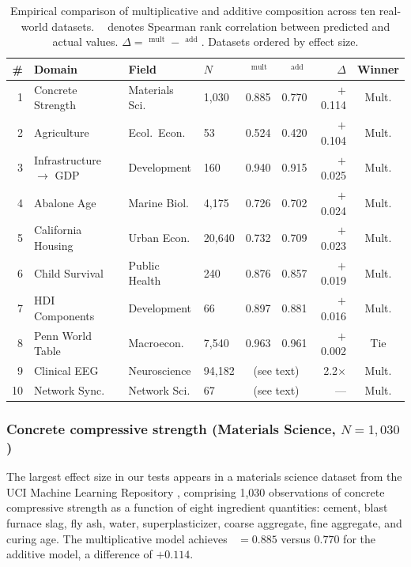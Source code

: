\documentclass[12pt, a4paper]{article}
\theoremstyle{definition}
\theoremstyle{remark}
\DeclareMathOperator{\Spearman}{\rho_s}
\begin{document}
\begin{table}[H]
\centering
\caption{Empirical comparison of multiplicative and additive composition across ten real-world datasets. $\Spearman$ denotes Spearman rank correlation between predicted and actual values. $\Delta = \Spearman^{\text{mult}} - \Spearman^{\text{add}}$. Datasets ordered by effect size.}\label{tab:results}
\smallskip
\begin{tabular}{@{}rlllrrrc@{}}
\toprule
\# & Domain & Field & $N$ & $\Spearman^{\text{mult}}$ & $\Spearman^{\text{add}}$ & $\Delta$ & Winner \\
\midrule
1 & Concrete Strength & Materials Sci. & 1{,}030 & 0.885 & 0.770 & $+$0.114 & Mult. \\
2 & Agriculture & Ecol.\ Econ. & 53 & 0.524 & 0.420 & $+$0.104 & Mult. \\
3 & Infrastructure $\to$ GDP & Development & 160 & 0.940 & 0.915 & $+$0.025 & Mult. \\
4 & Abalone Age & Marine Biol. & 4{,}175 & 0.726 & 0.702 & $+$0.024 & Mult. \\
5 & California Housing & Urban Econ. & 20{,}640 & 0.732 & 0.709 & $+$0.023 & Mult. \\
6 & Child Survival & Public Health & 240 & 0.876 & 0.857 & $+$0.019 & Mult. \\
7 & HDI Components & Development & 66 & 0.897 & 0.881 & $+$0.016 & Mult. \\
8 & Penn World Table & Macroecon. & 7{,}540 & 0.963 & 0.961 & $+$0.002 & Tie \\
\midrule
9 & Clinical EEG & Neuroscience & 94{,}182 & \multicolumn{2}{c}{(see text)} & 2.2$\times$ & Mult. \\
10 & Network Sync. & Network Sci. & 67 & \multicolumn{2}{c}{(see text)} & --- & Mult. \\
\bottomrule
\end{tabular}
\end{table}

\subsubsection{Concrete compressive strength (Materials Science, $N = 1{,}030$)}

The largest effect size in our tests appears in a materials science dataset from the UCI Machine Learning Repository \cite{yeh1998}, comprising 1,030 observations of concrete compressive strength as a function of eight ingredient quantities: cement, blast furnace slag, fly ash, water, superplasticizer, coarse aggregate, fine aggregate, and curing age. The multiplicative model achieves $\Spearman = 0.885$ versus $0.770$ for the additive model, a difference of $+0.114$.
\end{document}
